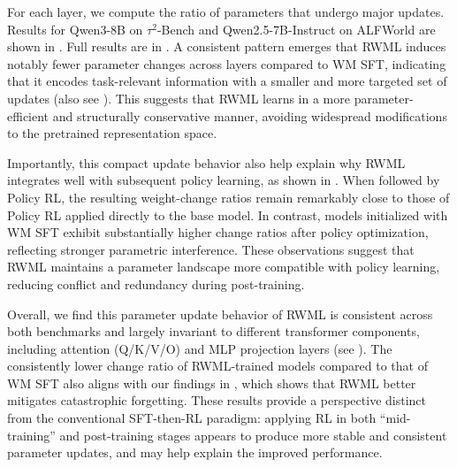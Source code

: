 \documentclass{article}
\theoremstyle{plain}
\theoremstyle{definition}
\theoremstyle{remark}
\newcommand{\policyrl}[0]{Policy RL}
\newcommand{\shortmethod}[0]{RWML}
\newcommand{\wmrlshort}[0]{\shortmethod}
\newcommand{\wmsftshort}[0]{WM SFT}
\begin{document}
For each layer, we compute the ratio of parameters that undergo major updates. Results for Qwen3-8B on $\tau^2$-Bench and Qwen2.5-7B-Instruct on ALFWorld are shown in .
Full results are in .
A consistent pattern emerges that \wmrlshort{} induces notably fewer parameter changes across layers compared to \wmsftshort{}, indicating that it encodes task-relevant information with a smaller and more targeted set of updates (also see ). This suggests that \wmrlshort{} learns in a more parameter-efficient and structurally conservative manner, avoiding widespread modifications to the pretrained representation space.

Importantly, this compact update behavior also help explain why \wmrlshort{} integrates well with subsequent policy learning, as shown in . When followed by \policyrl{}, the resulting weight-change ratios remain remarkably close to those of \policyrl{} applied directly to the base model. In contrast, models initialized with \wmsftshort{} exhibit substantially higher change ratios after policy optimization, reflecting stronger parametric interference.
These observations suggest that \wmrlshort{} maintains a parameter landscape more compatible with policy learning, reducing conflict and redundancy during post-training.

Overall, we find this parameter update behavior of \wmrlshort{} is consistent across both benchmarks and largely invariant to different transformer components, including attention (Q/K/V/O) and MLP projection layers (see ).
The consistently lower change ratio of \wmrlshort{}-trained models compared to that of \wmsftshort{} also aligns with our findings in , which shows that \wmrlshort{} better mitigates catastrophic forgetting.
These results provide a perspective distinct from the conventional SFT-then-RL paradigm: applying RL in both ``mid-training'' and post-training stages appears to produce more stable and consistent parameter updates, and may help explain the improved performance.
\end{document}
